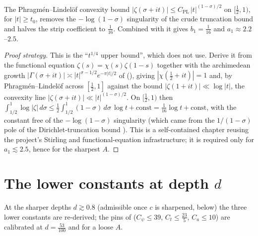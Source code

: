 \begin{lemma}
\label{lem:ls_upper_subconvex}
The Phragmén--Lindelöf convexity bound
$|\zeta(\sigma+it)|\le C_{\mathrm{PL}}\,|t|^{(1-\sigma)/2}$ on $[\tfrac12,1)$, for
$|t|\ge t_0$, removes the $-\log(1-\sigma)$ singularity of the crude truncation bound
and halves the strip coefficient to $\tfrac1{16}$. Combined with 
it gives $b_1=\tfrac1{16}$ and $a_1\approx2.2$--$2.5$.
\end{lemma}

\begin{proof}[Proof strategy]
This is the ``$t^{1/4}$ upper bound'', which  does not use.
Derive it from the functional equation
$\zeta(s)=\chi(s)\zeta(1-s)$ together with the archimedean growth
$|\Gamma(\sigma+it)|\asymp|t|^{\sigma-1/2}e^{-\pi|t|/2}$ of
 (), giving
$|\chi(\tfrac12+it)|=1$ and, by Phragmén--Lindelöf across $[\tfrac12,1]$ against the
bound $|\zeta(1+it)|\ll\log|t|$, the convexity line
$|\zeta(\sigma+it)|\ll|t|^{(1-\sigma)/2}$. On $[\tfrac12,1)$ then
$\int_{1/2}^1\log|\zeta|\,d\sigma\le\tfrac12\int_{1/2}^1(1-\sigma)\,d\sigma\,\log t
+\text{const}=\tfrac1{16}\log t+\text{const}$, with the constant free of the
$-\log(1-\sigma)$ singularity (which came from the $1/(1-\sigma)$ pole of the
Dirichlet-truncation bound ).
This is a self-contained chapter reusing the project's Stirling and functional-equation
infrastructure; it is required only for $a_1\lesssim2.5$, hence for the sharpest $A$.
\end{proof}

\section{The lower constants at depth \texorpdfstring{$d$}{d}}
\label{sec:ls_lower}

At the sharper depths $d\gtrsim0.8$ (admissible once $c$ is sharpened, below) the three
lower constants are re-derived; the pins of 
($C_\psi\le39$, $C_t\le\tfrac{23}5$, $C_a\le10$) are calibrated at $d=\tfrac{53}{100}$
and for a loose $A$.

